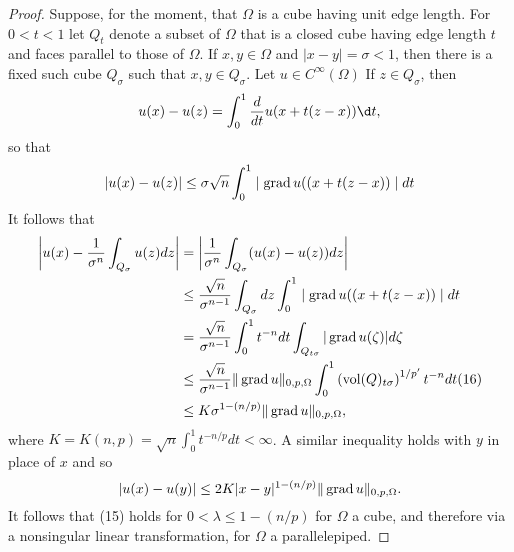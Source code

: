 \begin{proof}
  Suppose, for the moment, that $\Omega$ is a cube having unit edge length. For $0<t<1$ let $Q_t$ denote a subset of $\Omega$ that is a closed cube having edge length $t$ and faces parallel to those of $\Omega$. If $x, y \in \Omega$ and $|x-y|=\sigma<1$, then there is a fixed such cube $Q_\sigma$ such that $x, y \in Q_\sigma$.
  Let $u \in C^{\infty}(\Omega)$ If $z \in Q_\sigma$, then
  \[
  u(x)-u(z)=\int_0^1 \frac{d}{d t} u(x+t(z-x)) \d t,
  \]
  so that
  \[
  |u(x)-u(z)| \leq \sigma \sqrt{n} \int_0^1 \mid \operatorname{grad} u((x+t(z-x)) \mid d t
  \]
  It follows that
  \[
  \begin{aligned}
  \left|u(x)-\frac{1}{\sigma^n} \int_{Q_\sigma} u(z) d z\right| & =\left|\frac{1}{\sigma^n} \int_{Q_\sigma}(u(x)-u(z)) d z\right| \\
  & \leq \frac{\sqrt{n}}{\sigma^{n-1}} \int_{Q_\sigma} d z \int_0^1 \mid \operatorname{grad} u((x+t(z-x)) \mid d t \\
  & =\frac{\sqrt{n}}{\sigma^{n-1}} \int_0^1 t^{-n} d t \int_{Q_{t \sigma}}|\operatorname{grad} u(\zeta)| d \zeta \\
  & \leq \frac{\sqrt{n}}{\sigma^{n-1}}\|\operatorname{grad} u\|_{0, p, \Omega} \int_0^1\left(\operatorname{vol}(Q)_{t \sigma}\right)^{1 / p^{\prime}} t^{-n} d t(16) \\
  & \leq K \sigma^{1-(n / p)}\|\operatorname{grad} u\|_{0, p, \Omega},
  \end{aligned}
  \]
  where $K=K(n, p)=\sqrt{n} \int_0^1 t^{-n / p} d t<\infty$. A similar inequality holds with $y$ in place of $x$ and so
  \[
  |u(x)-u(y)| \leq 2 K|x-y|^{1-(n / p)}\|\operatorname{grad} u\|_{0, p, \Omega} .
  \]
  It follows that (15) holds for $0<\lambda \leq 1-(n / p)$ for $\Omega$ a cube,
  and therefore via a nonsingular linear transformation, for $\Omega$ a parallelepiped.
  

\end{proof}
